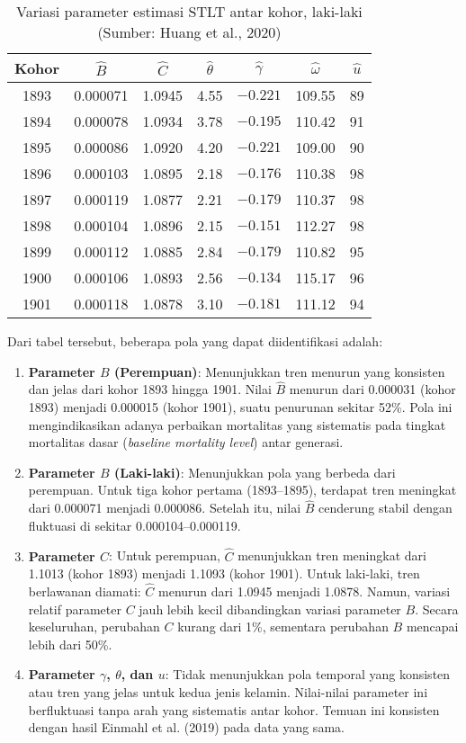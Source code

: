 \begin{table}[H]
\centering
\caption{Variasi parameter estimasi STLT antar kohor, laki-laki (Sumber: Huang et al., 2020)}
\label{tab:stlt_params_male}
\begin{tabular}{ccccccc}
\hline
Kohor & $\hat{B}$ & $\hat{C}$ & $\hat{\theta}$ & $\hat{\gamma}$ & $\hat{\omega}$ & $\hat{u}$ \\
\hline
1893 & 0.000071 & 1.0945 & 4.55 & $-0.221$ & 109.55 & 89 \\
1894 & 0.000078 & 1.0934 & 3.78 & $-0.195$ & 110.42 & 91 \\
1895 & 0.000086 & 1.0920 & 4.20 & $-0.221$ & 109.00 & 90 \\
1896 & 0.000103 & 1.0895 & 2.18 & $-0.176$ & 110.38 & 98 \\
1897 & 0.000119 & 1.0877 & 2.21 & $-0.179$ & 110.37 & 98 \\
1898 & 0.000104 & 1.0896 & 2.15 & $-0.151$ & 112.27 & 98 \\
1899 & 0.000112 & 1.0885 & 2.84 & $-0.179$ & 110.82 & 95 \\
1900 & 0.000106 & 1.0893 & 2.56 & $-0.134$ & 115.17 & 96 \\
1901 & 0.000118 & 1.0878 & 3.10 & $-0.181$ & 111.12 & 94 \\
\hline
\end{tabular}
\end{table}

Dari tabel tersebut, beberapa pola yang dapat diidentifikasi adalah:

\begin{enumerate}
\item \textbf{Parameter $B$ (Perempuan)}: Menunjukkan tren menurun yang konsisten dan jelas dari kohor 1893 hingga 1901. Nilai $\hat{B}$ menurun dari 0.000031 (kohor 1893) menjadi 0.000015 (kohor 1901), suatu penurunan sekitar 52\%. Pola ini mengindikasikan adanya perbaikan mortalitas yang sistematis pada tingkat mortalitas dasar (\textit{baseline mortality level}) antar generasi.

\item \textbf{Parameter $B$ (Laki-laki)}: Menunjukkan pola yang berbeda dari perempuan. Untuk tiga kohor pertama (1893--1895), terdapat tren meningkat dari 0.000071 menjadi 0.000086. Setelah itu, nilai $\hat{B}$ cenderung stabil dengan fluktuasi di sekitar 0.000104--0.000119.

\item \textbf{Parameter $C$}: Untuk perempuan, $\hat{C}$ menunjukkan tren meningkat dari 1.1013 (kohor 1893) menjadi 1.1093 (kohor 1901). Untuk laki-laki, tren berlawanan diamati: $\hat{C}$ menurun dari 1.0945 menjadi 1.0878. Namun, variasi relatif parameter $C$ jauh lebih kecil dibandingkan variasi parameter $B$. Secara keseluruhan, perubahan $C$ kurang dari 1\%, sementara perubahan $B$ mencapai lebih dari 50\%.

\item \textbf{Parameter $\gamma$, $\theta$, dan $u$}: Tidak menunjukkan pola temporal yang konsisten atau tren yang jelas untuk kedua jenis kelamin. Nilai-nilai parameter ini berfluktuasi tanpa arah yang sistematis antar kohor. Temuan ini konsisten dengan hasil Einmahl et al. (2019) pada data yang sama.
\end{enumerate}

